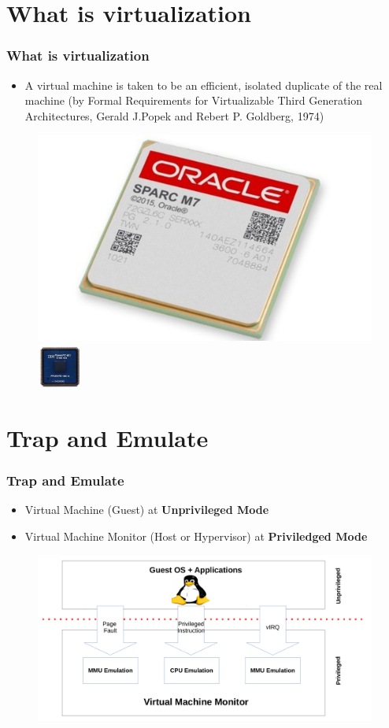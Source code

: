 \documentclass[aspectratio=169]{beamer}
\begin{document}
\section{What is virtualization}
\begin{frame}
\frametitle{What is virtualization}
\begin{itemize}
\item A virtual machine is taken to be an efficient, isolated duplicate of the real machine
(by Formal Requirements for Virtualizable Third Generation Architectures, Gerald J.Popek and Rebert P. Goldberg, 1974) \pause
\end{itemize}
\begin{center}
\begin{figure}
\includegraphics[width=0.3\linewidth]{figures/sparc.pdf}
\includegraphics[width=0.2\linewidth]{figures/power.pdf}
\end{figure}
\end{center}
\end{frame}


\section{Trap and Emulate}
\begin{frame}
\frametitle{Trap and Emulate}
\begin{itemize}
\item Virtual Machine (Guest) at \textbf{Unprivileged Mode}
\item Virtual Machine Monitor (Host or Hypervisor) at \textbf{Priviledged Mode}
\end{itemize}
\begin{figure}
\includegraphics[width=0.8\linewidth]{figures/trapemu.pdf}
\end{figure}
\end{frame}
\end{document}
